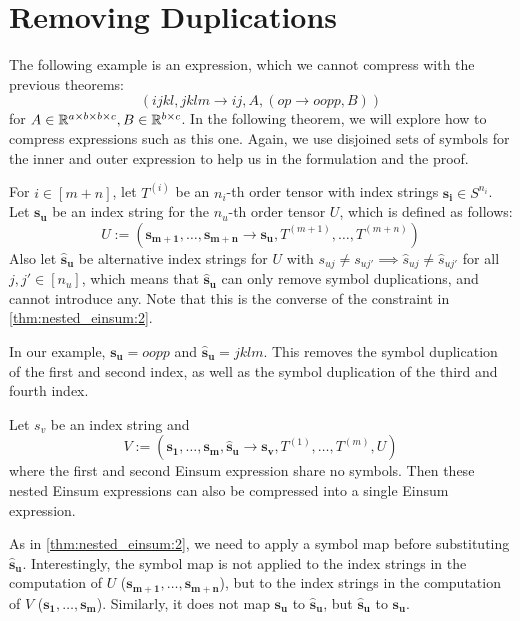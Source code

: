 \section{Removing Duplications}

The following example is an expression, which we cannot compress with the previous theorems:
$$(ijkl, jklm \rightarrow ij, A, (op \rightarrow oopp, B))$$
for $A \in \mathbb{R}^{a \times b \times b \times c}, B \in \mathbb{R}^{b \times c}$.
In the following theorem, we will explore how to compress expressions such as this one.
Again, we use disjoined sets of symbols for the inner and outer expression to help us in the formulation and the proof.

\begin{theorem}
    \label{thm:nested_einsum:3}

    For $i \in [m + n]$, let $T^{(i)}$ be an $n_i$-th order tensor with index strings $\bm{s_i} \in S^{n_i}$.
    Let $\bm{s_u}$ be an index string for the $n_u$-th order tensor $U$, which is defined as follows:
    $$U := (\bm{s_{m + 1}},\dots,\bm{s_{m + n}} \rightarrow \bm{s_u}, T^{(m + 1)},\dots,T^{(m + n)})$$
    Also let $\bm{\hat{s}_u}$ be alternative index strings for $U$ with $s_{uj} \neq s_{uj'} \implies \hat{s}_{uj} \neq \hat{s}_{uj'}$ for all $j, j' \in [n_u]$,
    which means that $\bm{\hat{s}_u}$ can only remove symbol duplications, and cannot introduce any.
    Note that this is the converse of the constraint in \autoref{thm:nested_einsum:2}.

    In our example, $\bm{s_u} = oopp$ and $\bm{\hat{s}_u} = jklm$.
    This removes the symbol duplication of the first and second index, as well as the symbol duplication of the third and fourth index.

    Let $s_v$ be an index string and
    $$V := (\bm{s_1},\dots,\bm{s_m}, \bm{\hat{s}_u} \rightarrow \bm{s_v}, T^{(1)},\dots,T^{(m)}, U)$$
    where the first and second Einsum expression share no symbols.
    Then these nested Einsum expressions can also be compressed into a single Einsum expression.

    As in \autoref{thm:nested_einsum:2}, we need to apply a symbol map before substituting $\bm{\hat{s}_u}$.
    Interestingly, the symbol map is not applied to the index strings in the computation of $U$ ($\bm{s_{m + 1}},\dots,\bm{s_{m + n}}$),
    but to the index strings in the computation of $V$ ($\bm{s_1},\dots,\bm{s_m}$).
    Similarly, it does not map $\bm{s_u}$ to $\bm{\hat{s}_u}$, but $\bm{\hat{s}_u}$ to $\bm{s_u}$.


\end{theorem}
